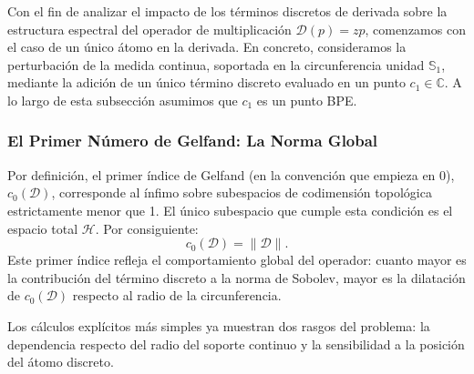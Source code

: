 \documentclass[12pt,a4paper]{article}
\theoremstyle{definition}
\theoremstyle{remark}
\newcommand{\C}{\mathbb{C}}
\newcommand{\D}{\mathcal{D}}
\begin{document}
Con el fin de analizar el impacto de los términos discretos de derivada sobre la estructura espectral del operador de multiplicación $\D(p)=zp$, comenzamos con el caso de un único átomo en la derivada. En concreto, consideramos la perturbación de la medida continua, soportada en la circunferencia unidad $\mathbb{S}_1$, mediante la adición de un único término discreto evaluado en un punto $c_1 \in \C$. A lo largo de esta subsección asumimos que $c_1$ es un punto BPE.

\subsubsection{El Primer Número de Gelfand: La Norma Global}

Por definición, el primer índice de Gelfand (en la convención que empieza en $0$), $c_0(\D)$, corresponde al ínfimo sobre subespacios de codimensión topológica estrictamente menor que 1. El único subespacio que cumple esta condición es el espacio total $\mathcal{H}$. Por consiguiente:
$$ c_0(\D) = \|\D\|. $$
Este primer índice refleja el comportamiento global del operador: cuanto mayor es la contribución del término discreto a la norma de Sobolev, mayor es la dilatación de $c_0(\D)$ respecto al radio de la circunferencia.

Los cálculos explícitos más simples ya muestran dos rasgos del problema: la dependencia respecto del radio del soporte continuo y la sensibilidad a la posición del átomo discreto.
\end{document}
